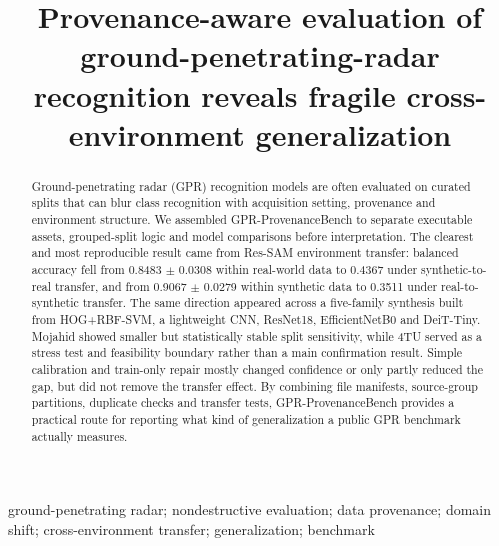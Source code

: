 \documentclass[]{interact}
\begin{document}

\title{Provenance-aware evaluation of ground-penetrating-radar recognition reveals fragile cross-environment generalization}

\author{
}

\maketitle

\begin{abstract}
Ground-penetrating radar (GPR) recognition models are often evaluated on curated splits that can blur class recognition with acquisition setting, provenance and environment structure. We assembled GPR-ProvenanceBench to separate executable assets, grouped-split logic and model comparisons before interpretation. The clearest and most reproducible result came from Res-SAM environment transfer: balanced accuracy fell from 0.8483 \(\pm\) 0.0308 within real-world data to 0.4367 under synthetic-to-real transfer, and from 0.9067 \(\pm\) 0.0279 within synthetic data to 0.3511 under real-to-synthetic transfer. The same direction appeared across a five-family synthesis built from HOG+RBF-SVM, a lightweight CNN, ResNet18, EfficientNetB0 and DeiT-Tiny. Mojahid showed smaller but statistically stable split sensitivity, while 4TU served as a stress test and feasibility boundary rather than a main confirmation result. Simple calibration and train-only repair mostly changed confidence or only partly reduced the gap, but did not remove the transfer effect. By combining file manifests, source-group partitions, duplicate checks and transfer tests, GPR-ProvenanceBench provides a practical route for reporting what kind of generalization a public GPR benchmark actually measures.
\end{abstract}

\begin{keywords}
ground-penetrating radar; nondestructive evaluation; data provenance;
domain shift; cross-environment transfer; generalization; benchmark
\end{keywords}
\end{document}
